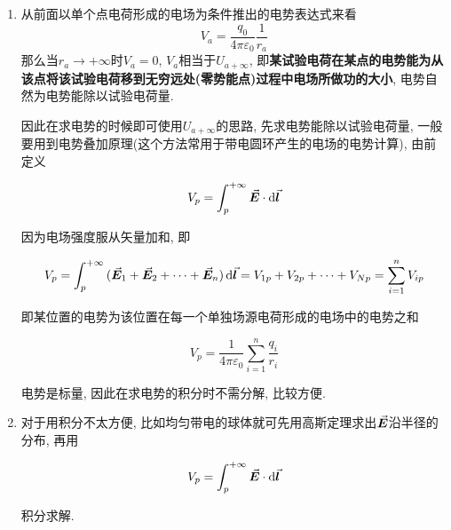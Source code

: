 \begin{enumerate}[itemindent=1em]
	
	\item 从前面以单个点电荷形成的电场为条件推出的电势表达式来看
	\begin{equation}
		V_a = \dfrac{q_0}{4 \pi \varepsilon_0} \dfrac{1}{r_a} \label{C7-eq12}
	\end{equation}
	那么当$r_a \rightarrow +\infty$时$V_a = 0$, $V_a$相当于$U_{a +\infty}$, 即\textbf{某试验电荷在某点的电势能为从该点将该试验电荷移到无穷远处(零势能点)过程中电场所做功的大小}, 电势自然为电势能除以试验电荷量. 
	
	因此在求电势的时候即可使用$U_{a +\infty}$的思路, 先求电势能除以试验电荷量, 一般要用到电势叠加原理(这个方法常用于带电圆环产生的电场的电势计算), 由前定义 
	
	\begin{equation}
		V_p = \int_{p}^{+\infty}{\va*{E}\cdot \dd{\va*{l}}} \label{C7-eq13}
	\end{equation}
	
	因为电场强度服从矢量加和, 即
	
	\begin{equation}
		V_p = \int_{p}^{+\infty}{(\va*{E}_1 + \va*{E}_2 + \cdots + \va*{E}_n)} \dd{\va*{l}} = V_{1p} + V_{2p} + \cdots + V_{Np} = \sum\limits_{i=1}^{n}{V_{ip}} \label{C7-eq14}
	\end{equation}
	
	即某位置的电势为该位置在每一个单独场源电荷形成的电场中的电势之和
	
	\begin{equation}
		V_p = \dfrac{1}{4\pi\varepsilon_0}\sum\limits_{i=1}^{n}\dfrac{q_i}{r_i}
	\end{equation}

	电势是标量, 因此在求电势的积分时不需分解, 比较方便. 
	
	\item 对于用积分不太方便, 比如均匀带电的球体就可先用高斯定理求出$\va*{E}$沿半径的分布, 再用
	
	\begin{equation*}
		V_p = \int_{p}^{+\infty}{\va*{E}\cdot \dd{\va*{l}}}
	\end{equation*}
	
	积分求解. 
	
\end{enumerate}

